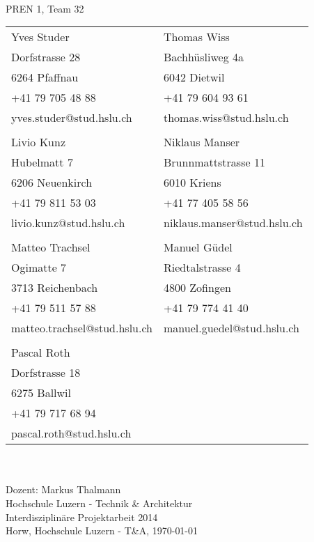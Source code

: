 \begin{titlepage}
    \begin{center}
        \parindent0pt{\Huge\bfseries \myDokumentTyp}\\
		\vspace*{0.5cm}
		{\huge PREN 1, Team 32}\\
		\vspace{2em}
        \begin{tabular}{ll}
        Yves Studer                & Thomas Wiss \\
        Dorfstrasse 28             & Bachhüsliweg 4a \\
        6264 Pfaffnau              & 6042 Dietwil \\
        +41 79 705 48 88           & +41 79 604 93 61 \\
        yves.studer@stud.hslu.ch   & thomas.wiss@stud.hslu.ch \\
                                   & \\
        Livio Kunz                 & Niklaus Manser \\
        Hubelmatt 7                & Brunnmattstrasse 11\\
        6206 Neuenkirch            & 6010 Kriens \\
        +41 79 811 53 03           & +41 77 405 58 56 \\
        livio.kunz@stud.hslu.ch    & niklaus.manser@stud.hslu.ch \\
                                   & \\
        Matteo Trachsel			   & Manuel Güdel \\
        Ogimatte 7                 & Riedtalstrasse 4\\
        3713 Reichenbach           & 4800 Zofingen\\
        +41 79 511 57 88           & +41 79 774 41 40 \\
        matteo.trachsel@stud.hslu.ch & manuel.guedel@stud.hslu.ch \\
        						   & \\
        Pascal Roth			       & \\
        Dorfstrasse 18			   & \\
        6275 Ballwil		       & \\
        +41 79 717 68 94	       & \\
        pascal.roth@stud.hslu.ch   & \\
        \end{tabular}\\
        \vspace{5em}
        {\Huge \myTitel}\\
        \vspace{5em}
        Dozent: Markus Thalmann\\
        \vspace{2em}
        Hochschule Luzern - Technik \& Architektur \\   
        Interdisziplinäre Projektarbeit 2014
        \vspace{8em}\\
        Horw, Hochschule Luzern - T\&A, \today
    \end{center}
\end{titlepage}